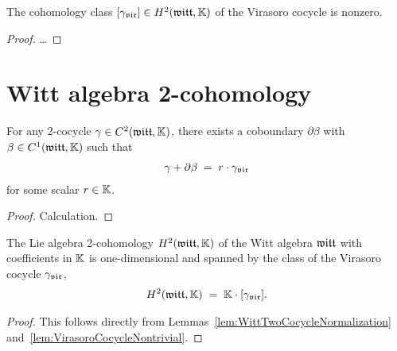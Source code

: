 \begin{lemma}
  \label{lem:VirasoroCocycleNontrivial}
  \leanok
  The cohomology class $[\gamma_{\mathfrak{vir}}] \in H^2(\mathfrak{witt},\mathbb{K})$
  of the Virasoro cocycle is nonzero.
\end{lemma}
\begin{proof}
  \leanok
  \ldots
\end{proof}

\section{Witt algebra 2-cohomology}

\begin{lemma}
  \label{lem:WittTwoCocycleNormalization}
  \leanok
  For any 2-cocycle $\gamma \in C^2(\mathfrak{witt},\mathbb{K})$, there exists
  a coboundary $\partial \beta$ with $\beta \in C^1(\mathfrak{witt},\mathbb{K})$
  such that
  \begin{align*}
    \gamma + \partial \beta \; = \; r \cdot \gamma_{\mathfrak{vir}}
  \end{align*}
  for some scalar $r \in \mathbb{K}$.
\end{lemma}
\begin{proof}
  \leanok
  Calculation.
\end{proof}

\begin{lemma}
  \label{lem:WittTwoCohomologyIsOneDimensional}
  \leanok
  The Lie algebra 2-cohomology $H^2(\mathfrak{witt},\mathbb{K})$ of the Witt
  algebra $\mathfrak{witt}$ with coefficients in $\mathbb{K}$ is one-dimensional
  and spanned by the class of the Virasoro cocycle $\gamma_{\mathfrak{vir}}$,
  \begin{align*}
    H^2(\mathfrak{witt},\mathbb{K}) \; = \; \mathbb{K} \cdot [\gamma_{\mathfrak{vir}}] .
  \end{align*}
\end{lemma}
\begin{proof}
  \leanok
  This follows directly from
  Lemmas~\ref{lem:WittTwoCocycleNormalization}
  and~\ref{lem:VirasoroCocycleNontrivial}.
\end{proof}
